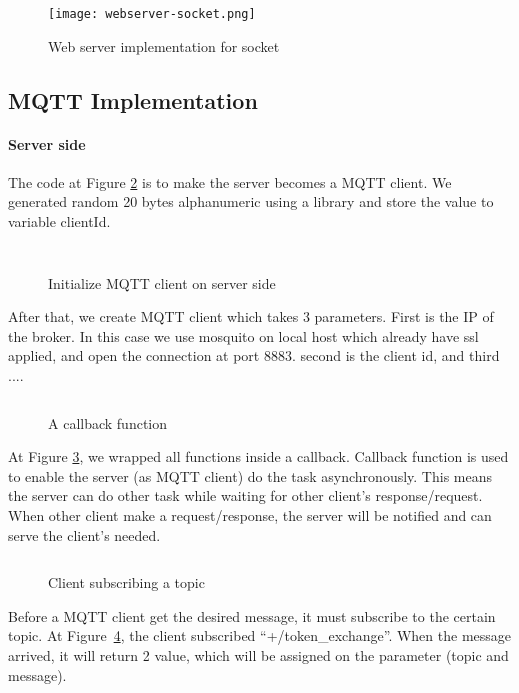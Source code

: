 \begin{figure}[!h]
\centering
\texttt{[image: webserver-socket.png]}
\caption{Web server implementation for socket}\label{fig:webserver-socket}
\end{figure}

\subsection{MQTT Implementation}
\paragraph{Server side}
The code at Figure \ref{fig:mqttc-server} is to make the server becomes a MQTT client. We generated random 20 bytes alphanumeric using a library and store the value to variable clientId. 
\begin{figure}[h]
\inputminted[firstline=12]{kotlin}{code/mqtt-main.kt}
\inputminted[firstline=25, lastline=30]{kotlin}{code/mqtt-main.kt}
\caption{Initialize MQTT client on server side}
\label{fig:mqttc-server}
\end{figure}

After that, we create MQTT client which takes 3 parameters. First is the IP of the broker. In this case we use mosquito on local host which already have ssl applied, and open the connection at port 8883. second is the client id, and third ....

\begin{figure}[h]
\inputminted[firstline=31]{kotlin}{code/mqtt-main.kt}
\caption{A callback function}
\label{fig:mqtt-callback}
\end{figure}
At Figure \ref{fig:mqtt-callback}, we wrapped all functions inside a callback. Callback function is used to enable the server (as MQTT client) do the task asynchronously. This means the server can do other task while waiting for other client's response/request. When other client make a request/response, the server will be notified and can  serve the client's needed.

\begin{figure}[h]
\inputminted[firstline=36]{kotlin}{code/mqtt-main.kt}
\caption{Client subscribing a topic}
\label{fig:mqtt-subscribe}
\end{figure}
Before a MQTT client get the desired message, it must subscribe to the certain topic. At Figure~\ref{fig:mqtt-subscribe}, the client subscribed ``+/token\_exchange''. When the message arrived, it will return 2 value, which will be assigned on the parameter (topic and message).

